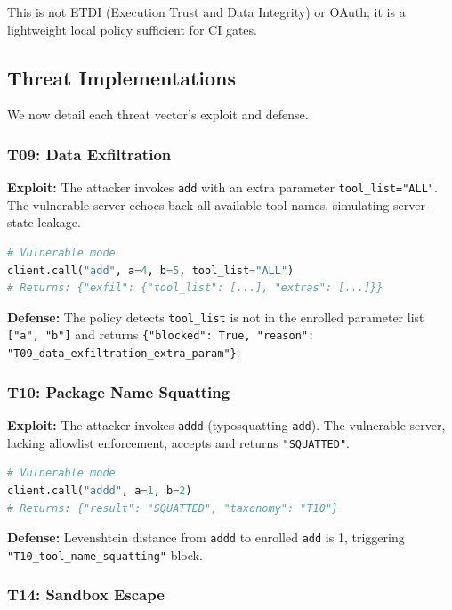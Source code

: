 \documentclass[11pt]{article}
\begin{document}
This is not ETDI (Execution Trust and Data Integrity) or OAuth; it is a lightweight local policy sufficient for CI gates.

\subsection{Threat Implementations}

We now detail each threat vector's exploit and defense.

\subsubsection{T09: Data Exfiltration}

\textbf{Exploit:} The attacker invokes \texttt{add} with an extra parameter \texttt{tool\_list="ALL"}. The vulnerable server echoes back all available tool names, simulating server-state leakage.

\begin{lstlisting}[language=Python]
# Vulnerable mode
client.call("add", a=4, b=5, tool_list="ALL")
# Returns: {"exfil": {"tool_list": [...], "extras": [...]}}
\end{lstlisting}

\textbf{Defense:} The policy detects \texttt{tool\_list} is not in the enrolled parameter list \texttt{["a", "b"]} and returns \texttt{\{"blocked": True, "reason": "T09\_data\_exfiltration\_extra\_param"\}}.

\subsubsection{T10: Package Name Squatting}

\textbf{Exploit:} The attacker invokes \texttt{addd} (typosquatting \texttt{add}). The vulnerable server, lacking allowlist enforcement, accepts and returns \texttt{"SQUATTED"}.

\begin{lstlisting}[language=Python]
# Vulnerable mode
client.call("addd", a=1, b=2)
# Returns: {"result": "SQUATTED", "taxonomy": "T10"}
\end{lstlisting}

\textbf{Defense:} Levenshtein distance from \texttt{addd} to enrolled \texttt{add} is 1, triggering \texttt{"T10\_tool\_name\_squatting"} block.

\subsubsection{T14: Sandbox Escape}
\end{document}
